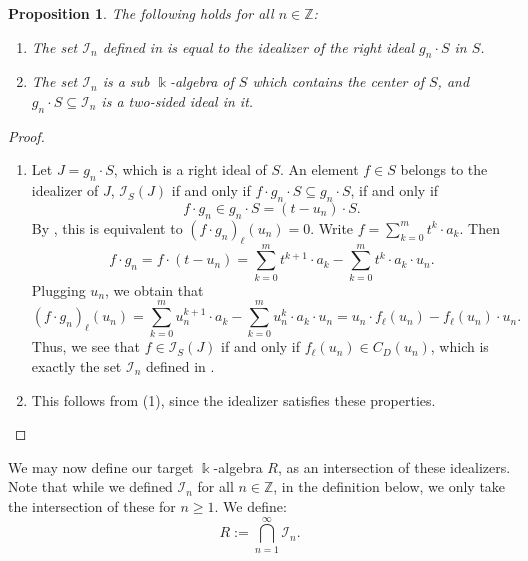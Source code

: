 \documentclass{amsart}
\newtheorem{prop}[equation]{Proposition}
\theoremstyle{definition}
\renewcommand{\k}{\Bbbk}
\numberwithin{equation}{section}
\begin{document}
\begin{prop}\label{prop:idealizer}
The following holds for all $n \in \mathbb{Z}$:
\begin{enumerate}
\item The set $\mathcal{I}_n$ defined in  is equal to the idealizer of the right ideal $g_n\cdot S$ in $S$.
\item The set $\mathcal{I}_n$ is a sub $\k$-algebra of $S$ which contains the center of $S$,
and $g_n\cdot S \subseteq \mathcal{I}_n$ is a two-sided ideal in it.
\end{enumerate}
\end{prop}
\begin{proof}
\quad
\begin{enumerate}
\item Let $J = g_n \cdot S$,
which is a right ideal of $S$.
An element $f \in S$ belongs to the idealizer of $J$, 
$\mathcal{I}_S(J)$
if and only if $f\cdot g_n \cdot S \subseteq g_n \cdot S$,
if and only if 
\[
f\cdot g_n \in g_n \cdot S = (t-u_n)\cdot S.
\]
By ,
this is equivalent to $(f\cdot g_n)_{\ell}(u_n) = 0$.
Write $f = \sum_{k=0}^m t^k\cdot a_k$.
Then 
\[
f \cdot g_n = f\cdot (t-u_n) = \sum_{k=0}^m t^{k+1}\cdot a_k - \sum_{k=0}^m t^k\cdot a_k \cdot u_n.
\]
Plugging $u_n$, we obtain that
\[
(f\cdot g_n)_{\ell}(u_n) = 
\sum_{k=0}^m u_n^{k+1}\cdot a_k - \sum_{k=0}^m u_n^k\cdot a_k \cdot u_n = 
u_n \cdot f_{\ell}(u_n) - f_{\ell}(u_n)\cdot u_n.
\]
Thus, we see that $f \in \mathcal{I}_S(J)$ 
if and only if $f_{\ell}(u_n) \in C_D(u_n)$,
which is exactly the set $\mathcal{I}_n$ defined in .
\item This follows from (1), since the idealizer satisfies these properties.
\end{enumerate}
\end{proof}

We may now define our target $\k$-algebra $R$,
as an intersection of these idealizers.
Note that while we defined $\mathcal{I}_n$ for all $n \in \mathbb{Z}$,
in the definition below, we only take the intersection of these for $n \ge 1$. We define:
\begin{equation}\label{eqn:theR}
R := \bigcap_{n=1}^{\infty} \mathcal{I}_n.    
\end{equation}
\end{document}
